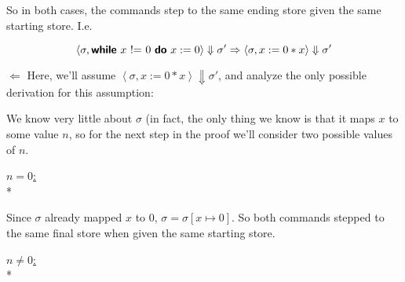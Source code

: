 \documentclass[11pt]{article}
\begin{document}
\begin{exercise}
\begin{enumerate}
So in both cases, the commands step to the same ending store given the same starting store. I.e.

$$\left< \sigma, \while{x~\mathord{!}\mathord{=}~0}{x := 0} \right> \Downarrow \sigma' \Rightarrow \left< \sigma, x:= 0 * x \right> \Downarrow \sigma'$$


$\Leftarrow$
Here, we'll assume $\left < \sigma, x:=0 * x \right> \Downarrow \sigma'$, and analyze the only possible derivation for this assumption:

\begin{prooftree}
\end{prooftree}

We know very little about $\sigma$ (in fact, the only thing we know is that it maps $x$ to some value $n$, so for the next step in the proof we'll consider two possible values of $n$.

\underline{$n = 0$:}\\*

\begin{prooftree}
\end{prooftree}

Since $\sigma$ already mapped $x$ to 0, $\sigma = \sigma[x \mapsto 0]$. So both commands stepped to the same final store when given the same starting store.

\underline{$n \neq 0$:}\\*

\footnotesize 
\begin{prooftree}
\end{prooftree}
\normalsize


\end{enumerate}
\end{exercise}
\end{document}
